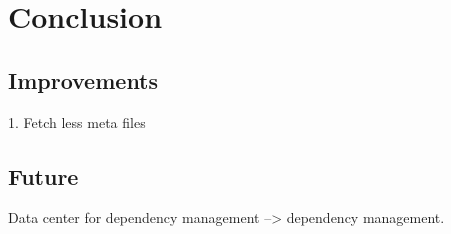 \section{Conclusion}

\subsection{Improvements}

1. Fetch less meta files

\subsection{Future}

Data center for dependency management --> dependency management.
